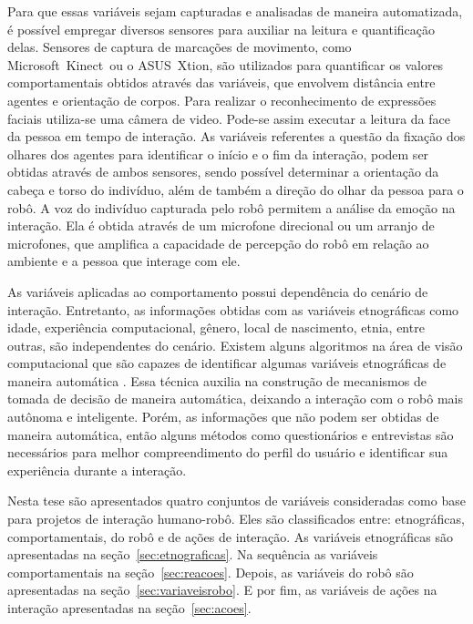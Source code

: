 Para que essas variáveis sejam capturadas e analisadas de maneira automatizada, é possível empregar diversos sensores para auxiliar na leitura e quantificação delas. Sensores de captura de marcações de movimento, como Microsoft\textregistered\ Kinect\textregistered\ ou o ASUS\textregistered\ Xtion\textregistered, são utilizados para quantificar os valores comportamentais obtidos através das variáveis, que envolvem distância entre agentes e orientação de corpos. Para realizar o reconhecimento de expressões faciais utiliza-se uma câmera de video. Pode-se assim executar a leitura da face da pessoa em tempo de interação. As variáveis referentes a questão da fixação dos olhares dos agentes para identificar o início e o fim da interação, podem ser obtidas através de ambos sensores, sendo possível determinar a orientação da cabeça e torso do indivíduo, além de também a direção do olhar da pessoa para o robô. A voz do indivíduo capturada pelo robô permitem a análise da emoção na interação. Ela é obtida através de um microfone direcional ou um arranjo de microfones, que amplifica a capacidade de percepção do robô em relação ao ambiente e a pessoa que interage com ele.

As variáveis aplicadas ao comportamento 	possui dependência do cenário de interação. Entretanto, as informações obtidas com as variáveis etnográficas como idade, experiência computacional, gênero, local de nascimento, etnia, entre outras, são independentes do cenário. Existem alguns algoritmos na área de visão computacional que são capazes de identificar algumas variáveis etnográficas de maneira automática \cite{yang:2007, shan:2012, ylioinas:2012, samadi:2013, amaral:2014}. Essa técnica auxilia na construção de mecanismos de tomada de decisão de maneira automática, deixando a interação com o robô mais autônoma e inteligente. Porém, as informações que não podem ser obtidas de maneira automática, então alguns métodos como questionários e entrevistas são necessários para melhor compreendimento do perfil do usuário e identificar sua experiência durante a interação.

Nesta tese são apresentados quatro conjuntos de variáveis consideradas como base para projetos de interação humano-robô. Eles são classificados entre: etnográficas, comportamentais, do robô e de ações de interação. As variáveis etnográficas são apresentadas na seção~\ref{sec:etnograficas}. Na sequência as variáveis comportamentais na seção~\ref{sec:reacoes}. Depois, as variáveis do robô são apresentadas na seção~\ref{sec:variaveisrobo}. E por fim, as variáveis de ações na interação apresentadas na seção~\ref{sec:acoes}.

